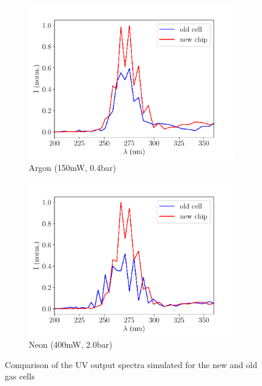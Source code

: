 \documentclass[a4paper]{jpconf}
\begin{document}
\begin{figure}[h]
\centering
 \begin{subfigure}{0.5\textwidth}
\includegraphics[width=\textwidth]{im/Ar_old_v_new}
\caption{Argon (150mW, 0.4bar)}\label{im:coms_Ar}
\end{subfigure}
 \begin{subfigure}{0.5\textwidth}
\includegraphics[width=\textwidth]{im/Ne_old_v_new}
\caption{Neon (400mW, 2.0bar)}\label{im:coms_Ne}
\end{subfigure}
\caption{Comparison of the UV output spectra simulated for the new and old gas cells}\label{im:coms}
\end{figure}
\end{document}
